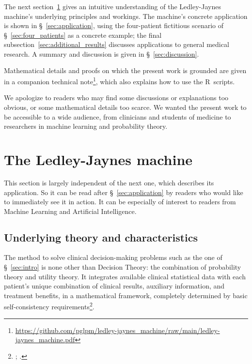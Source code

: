 \documentclass[utf8]{FrontiersinHarvard} %
\newcommand*{\sect}{\S}%
\newcommand*{\chaps}{chs}%
\renewcommand*{\|}[1][]{\nonscript\:#1\vert\nonscript\:\mathopen{}}
\newcommand*{\ljm}{Ledley-Jaynes machine}
\begin{document}
The next section~\ref{sec:the_machine} gives an intuitive understanding of the \ljm's underlying principles and workings. The machine's concrete application is shown in \sect~\ref{sec:application}, using the four-patient fictitious scenario of \sect~\ref{sec:four_patients} as a concrete example; the final subsection~\ref{sec:additional_results} discusses applications to general medical research. A summary and discussion is given in \sect~\ref{sec:discussion}.

Mathematical details and proofs on which the present work is grounded are given in a companion technical note\footnote{\url{https://github.com/pglpm/ledley-jaynes\_machine/raw/main/ledley-jaynes\_machine.pdf}}, which also explains how to use the R~scripts.

We apologize to readers who may find some discussions or explanations too obvious, or some mathematical details too scarce. We wanted the present work to be accessible to a wide audience, from clinicians and students of medicine to researchers in machine learning and probability theory.


\bigskip%
\section{The \ljm}
\label{sec:the_machine}

This section is largely independent of the next one, which describes its application. So it can be read after \sect~\ref{sec:application}
by readers who would like to immediately see it in action. It can be especially of interest to readers from Machine Learning and Artificial Intelligence.

\subsection{Underlying theory and characteristics}
\label{sec:the_machine_principles}

The method to solve clinical decision-making problems such as the one of \sect~\ref{sec:intro} %
is none other than Decision Theory: the combination of probability theory and utility theory. It integrates available clinical statistical data with each patient's unique combination of clinical results, auxiliary information, and treatment benefits, in a mathematical framework, completely determined by basic self-consistency requirements\footnote{\citet[\chaps~13--14]{jaynes1994_r2003}; \citet{vonneumannetal1944_r1955,cox1946,savage1954_r1972,luceetal1957,raiffaetal1961_r2000,raiffa1968_r1970,lindley1971_r1988,kreps1988}.}.
\end{document}
